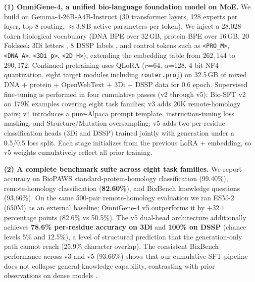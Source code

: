 \documentclass[11pt]{article}
\begin{document}
\textbf{(1) OmniGene-4, a unified bio-language foundation model on MoE.} We build on Gemma-4-26B-A4B-Instruct \citep{gemmateam2025} (30 transformer layers, 128 experts per layer, top-8 routing, $\approx 3.8$\,B active parameters per token). We inject a 28{,}028-token biological vocabulary (DNA BPE over 32\,GB, protein BPE over 16\,GB, 20 Foldseek 3Di letters \citep{vankempen2024foldseek}, 8 DSSP labels \citep{kabsch1983dssp}, and control tokens such as \texttt{<PRO\_M>}, \texttt{<DNA\_A>}, \texttt{<3Di\_p>}, \texttt{<2D\_H>}), extending the embedding table from $262{,}144$ to $290{,}172$. Continued pretraining uses QLoRA \citep{dettmers2023qlora, hu2022lora} ($r$=64, $\alpha$=128, 4-bit NF4 quantization, eight target modules including \texttt{router.proj}) on 32.5\,GB of mixed DNA + protein + OpenWebText + 3Di + DSSP data for 0.6 epoch. Supervised fine-tuning is performed in four cumulative passes (v2 through v5): Bio-SFT v2 on 179K examples covering eight task families; v3 adds 20K remote-homology pairs; v4 introduces a pure-Alpaca prompt template, instruction-tuning loss masking, and Structure/Mutation oversampling; v5 adds two per-residue classification heads (3Di and DSSP) trained jointly with generation under a 0.5/0.5 loss split. Each stage initializes from the previous LoRA + embedding, so v5 weights cumulatively reflect all prior training.

\textbf{(2) A complete benchmark suite across eight task families.} We report accuracy on BioPAWS \citep{wang2026biopaws} standard-protein-homology classification (99.40\%), remote-homology classification (\textbf{82.60\%}), and BixBench \citep{bixbench2024} knowledge questions (93.66\%). On the same 500-pair remote-homology evaluation we ran ESM-2 (650M) \citep{lin2023evolutionary} as an external baseline; OmniGene-4 v5 outperforms it by $+32.1$ percentage points (82.6\% vs 50.5\%). The v5 dual-head architecture additionally achieves \textbf{78.6\% per-residue accuracy on 3Di} and \textbf{100\% on DSSP} (chance levels 5\% and 12.5\%), a level of structured prediction that the generation-only path cannot reach (25.9\% character overlap). The consistent BixBench performance across v3 and v5 (93.66\%) shows that our cumulative SFT pipeline does not collapse general-knowledge capability, contrasting with prior observations on dense models \citep{luo2023forgetting}.
\end{document}
